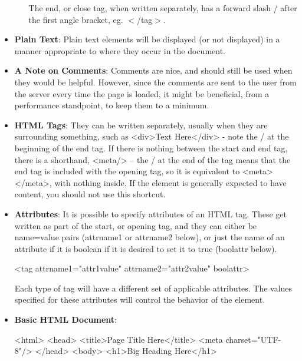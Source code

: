 \documentclass{report}
\begin{document}
\begin{itemize}
\begin{enumerate}
                    \bigbreak \noindent 
                    The end, or close tag, when written separately, has a forward slash / after the first angle bracket, eg. $<$/tag$>$.
            \end{enumerate}
        \item \textbf{Plain Text}: Plain text elements will be displayed (or not displayed) in a manner appropriate to where they occur in the document.
        \item \textbf{A Note on Comments}: Comments are nice, and should still be used when they would be helpful. However, since the comments are sent to the user from the server every time the page is loaded, it might be beneficial, from a performance standpoint, to keep them to a minimum.
        \item \textbf{HTML Tags}: They can be written separately, usually when they are surrounding something, such as <div>Text Here</div> - note the / at the beginning of the end tag.
            \bigbreak \noindent 
             If there is nothing between the start and end tag, there is a shorthand, <meta/> – the / at the end of the tag means that the end tag is included with the opening tag, so it is equivalent to <meta></meta>, with nothing inside.
             \bigbreak \noindent 
             If the element is generally expected to have content, you should not use this shortcut.
            \item \textbf{Attributes}: It is possible to specify attributes of an HTML tag. These get written as part of the start, or opening tag, and they can either be name=value pairs (attrname1 or attrname2 below), or just the name of an attribute if it is boolean if it is desired to set it to true (boolattr below).
                \bigbreak \noindent 
                \begin{htmlcode}
                <tag attrname1="attr1value" attrname2="attr2value" boolattr>
                \end{htmlcode}
                \bigbreak \noindent 
                Each type of tag will have a different set of applicable attributes. The values specified for these attributes will control the behavior of the element.
    \item \textbf{Basic HTML Document}:
        \bigbreak \noindent 
        \begin{htmlcode}
            <html>
                <head>
                    <title>Page Title Here</title>
                    <meta charset="UTF-8"/>
                </head>
                <body>
                    <h1>Big Heading Here</h1>

\end{htmlcode}
\end{itemize}
\end{document}

